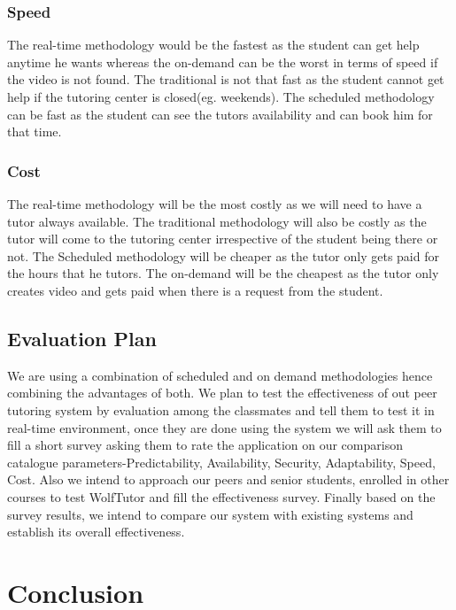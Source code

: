 \documentclass{sig-alternate-05-2015}
\begin{document}
\subsubsection{Speed}

The real-time methodology would be the fastest as the student can get help anytime he wants whereas the on-demand can be the worst in terms of speed if the video is not found. The traditional is not that fast as the student cannot get help if the tutoring center is closed(eg. weekends). The scheduled methodology can be fast as the student can see the tutors availability and can book him for that time.

\subsubsection{Cost}

The real-time methodology will be the most costly as we will need to have a tutor always available. The traditional methodology will also be costly as the tutor will come to the tutoring center irrespective of the student being there or not. The Scheduled methodology will be cheaper as the tutor only gets paid for the hours that he tutors. The on-demand will be the cheapest as the tutor only creates video and gets paid when there is a request from the student.

\subsection{Evaluation Plan}

We are using a combination of scheduled and on demand methodologies hence combining the advantages of both. We plan to test the effectiveness of out peer tutoring system by evaluation among the classmates and tell them to test it in real-time environment, once they are done using the system we will ask them to fill a short survey asking them to rate the application on our comparison catalogue parameters-Predictability, Availability, Security, Adaptability, Speed, Cost. Also we intend to approach our peers and senior students, enrolled in other courses to test WolfTutor and fill the effectiveness survey. Finally based on the survey results, we intend to compare our system with existing systems and establish its overall effectiveness.

\section{Conclusion}
\end{document}
